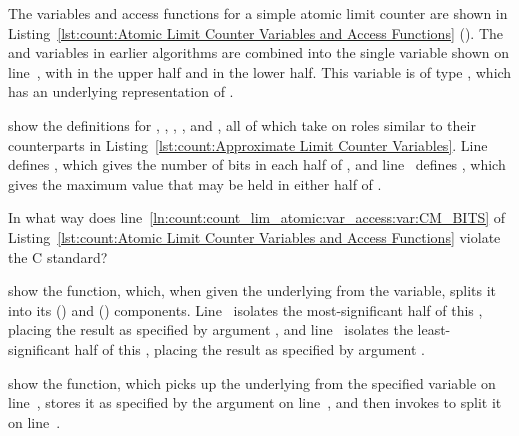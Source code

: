 \begin{lineref}
The variables and access functions for a simple atomic limit counter
are shown in
Listing~\ref{lst:count:Atomic Limit Counter Variables and Access Functions}
().
The  and  variables in earlier algorithms
are combined into the single variable  shown on
line~, with  in the upper half and  in
the lower half.
This variable is of type , which has an underlying
representation of .

 show the definitions for , ,
, , and , all of which
take on roles similar to their counterparts in
Listing~\ref{lst:count:Approximate Limit Counter Variables}.
Line~ defines , which gives the number of bits in each half
of , and line~ defines , which
gives the maximum value that may be held in either half of
.
\end{lineref}

\QuickQuiz{}
	In what way does
        line~\ref{ln:count:count_lim_atomic:var_access:var:CM_BITS} of
	Listing~\ref{lst:count:Atomic Limit Counter Variables and Access Functions}
	violate the C standard?
 \QuickQuizEnd

\begin{lineref}
 show the 
function, which,
when given the underlying  from the
 variable, splits it into its
 ()
and  () components.
Line~ isolates the most-significant half of this ,
placing the result as specified by argument ,
and line~ isolates the least-significant half of this ,
placing the result as specified by argument .
\end{lineref}

\begin{lineref}
 show the  function, which
picks up the underlying  from the specified variable
on line~, stores it as specified by the  argument on
line~, and then invokes  to split
it on line~.
\end{lineref}

